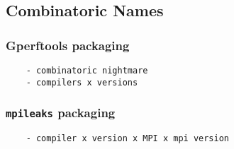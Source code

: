 
\subsection{Combinatoric Names}
\label{sec:usecase-combinatoric}


\subsubsection{Gperftools packaging}

\begin{verbatim}
	- combinatoric nightmare
	- compilers x versions
\end{verbatim}

\subsubsection{{\tt mpileaks} packaging}
\begin{verbatim}
	- compiler x version x MPI x mpi version
\end{verbatim}

